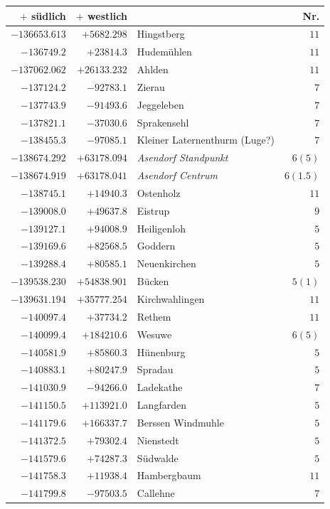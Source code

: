 \begin{center}\begingroup\fontsize{8}{9}\selectfont
\setlength{\tabcolsep}{4pt}
\begin{tabular}{r|r|p{170pt}|r}\hline
\(+\) südlich&\(+\) westlich&&Nr.\\\hline
\(-136653.613\)&\(+5682.298\)&Hingstberg&\(11\)\\
\(-136749.2\)&\(+23814.3\)&Hudemühlen&\(11\)\\
\(-137062.062\)&\(+26133.232\)&Ahlden&\(11\)\\
\(-137124.2\)&\(-92783.1\)&Zierau&\(7\)\\
\(-137743.9\)&\(-91493.6\)&Jeggeleben&\(7\)\\
\(-137821.1\)&\(-37030.6\)&Sprakensehl&\(7\)\\
\(-138455.3\)&\(-97085.1\)&Kleiner Laternenthurm (Luge?)&\(7\)\\
\(-138674.292\)&\(+63178.094\)&\textit{Asendorf Standpunkt}&\(6 (5)\)\\
\(-138674.919\)&\(+63178.041\)&\textit{Asendorf Centrum}&\(6(1.5)\)\\
\(-138745.1\)&\(+14940.3\)&Ostenholz&\(11\)\\
\(-139008.0\)&\(+49637.8\)&Eistrup&\(9\)\\
\(-139127.1\)&\(+94008.9\)&Heiligenloh&\(5\)\\
\(-139169.6\)&\(+82568.5\)&Goddern&\(5\)\\
\(-139288.4\)&\(+80585.1\)&Neuenkirchen&\(5\)\\
\(-139538.230\)&\(+54838.901\)&Bücken&\(5 (1)\)\\
\(-139631.194\)&\(+35777.254\)&Kirchwahlingen&\(11\)\\
\(-140097.4\)&\(+37734.2\)&Rethem&\(11\)\\
\(-140099.4\)&\(+184210.6\)&Wesuwe&\(6 (5)\)\\
\(-140581.9\)&\(+85860.3\)&Hünenburg&\(5\)\\
\(-140883.1\)&\(+80247.9\)&Spradau&\(5\)\\
\(-141030.9\)&\(-94266.0\)&Ladekathe&\(7\)\\
\(-141150.5\)&\(+113921.0\)&Langfarden&\(5\)\\
\(-141179.6\)&\(+166337.7\)&Berssen Windmuhle&\(5\)\\
\(-141372.5\)&\(+79302.4\)&Nienstedt&\(5\)\\
\(-141579.6\)&\(+74287.3\)&Südwalde&\(5\)\\
\(-141758.3\)&\(+11938.4\)&Hambergbaum&\(11\)\\
\(-141799.8\)&\(-97503.5\)&Callehne&\(7\)\\

\end{tabular}
\end{center}
